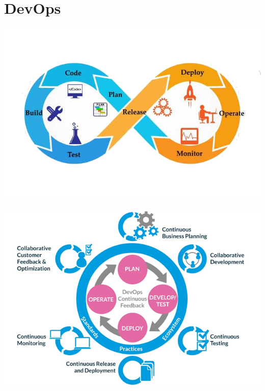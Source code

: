 \documentclass{article}[18pt]
\begin{document}
\section{DevOps}
\begin{center}
	\includegraphics[scale=0.7]{DevOps}
\end{center}
\begin{center}
	\includegraphics[scale=0.7]{DevOps1}
\end{center}
\end{document}
